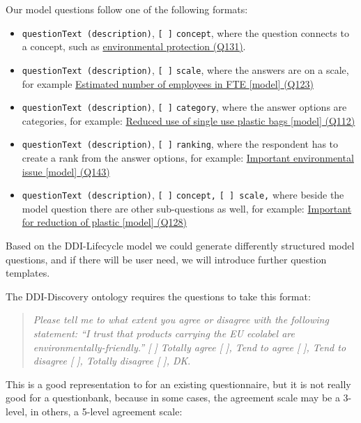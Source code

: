 \documentclass[
  letterpaper,
  DIV=11,
  numbers=noendperiod]{scrreprt}
\providecommand{\tightlist}{%
  \setlength{\itemsep}{0pt}\setlength{\parskip}{0pt}}\usepackage{longtable,booktabs,array}
\begin{document}
Our model questions follow one of the following formats:

\begin{itemize}
\tightlist
\item
  \texttt{questionText\ (description)}, \texttt{{[}\ {]}}
  \texttt{concept}, where the question connects to a concept, such as
  \href{https://reprexbase.eu/demowiki/index.php?title=Item:Q131}{environmental
  protection (Q131)}.
\item
  \texttt{questionText\ (description)}, \texttt{{[}\ {]}}
  \texttt{scale}, where the answers are on a scale, for example
  \href{https://reprexbase.eu/demowiki/index.php?title=Item:Q123}{Estimated
  number of employees in FTE {[}model{]} (Q123)}
\item
  \texttt{questionText\ (description)}, \texttt{{[}\ {]}}
  \texttt{category}, where the answer options are categories, for
  example:
  \href{https://reprexbase.eu/demowiki/index.php?title=Item:Q112}{Reduced
  use of single use plastic bags {[}model{]} (Q112)}
\item
  \texttt{questionText\ (description)}, \texttt{{[}\ {]}}
  \texttt{ranking}, where the respondent has to create a rank from the
  answer options, for example:
  \href{https://reprexbase.eu/demowiki/index.php?title=Item:Q143}{Important
  environmental issue {[}model{]} (Q143)}
\item
  \texttt{questionText\ (description)}, \texttt{{[}\ {]}}
  \texttt{concept,} \texttt{{[}\ {]}\ scale,} where beside the model
  question there are other sub-questions as well, for example:
  \href{https://reprexbase.eu/demowiki/index.php?title=Item:Q128}{Important
  for reduction of plastic {[}model{]} (Q128)}
\end{itemize}

Based on the DDI-Lifecycle model we could generate differently
structured model questions, and if there will be user need, we will
introduce further question templates.

The DDI-Discovery ontology requires the questions to take this format:

\begin{quote}
\emph{Please tell me to what extent you agree or disagree with the
following statement: ``I trust that products carrying the EU ecolabel
are environmentally-friendly.'' {[} {]} Totally agree {[} {]}, Tend to
agree {[} {]}, Tend to disagree {[} {]}, Totally disagree {[} {]}, DK}.
\end{quote}

This is a good representation to for an existing questionnaire, but it
is not really good for a questionbank, because in some cases, the
agreement scale may be a 3-level, in others, a 5-level agreement scale:
\end{document}
